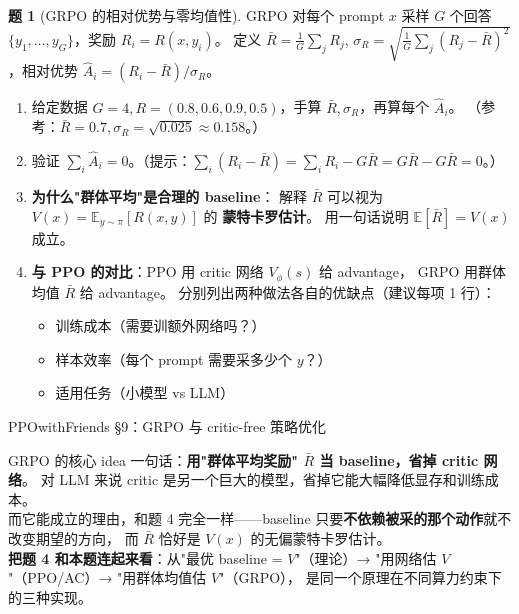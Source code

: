 \documentclass[11pt,a4paper]{article}
\theoremstyle{definition}
\newtheorem{problem}{题}
\begin{document}
\medskip

\begin{problem}[GRPO 的相对优势与零均值性]
GRPO 对每个 prompt $x$ 采样 $G$ 个回答 $\{y_1, \ldots, y_G\}$，奖励 $R_i = R(x, y_i)$。
定义 $\bar R = \frac{1}{G}\sum_j R_j$, $\sigma_R = \sqrt{\frac{1}{G}\sum_j (R_j - \bar R)^2}$，相对优势 $\hat A_i = (R_i - \bar R)/\sigma_R$。

\begin{enumerate}[label=(\alph*)]
    \item 给定数据 $G = 4, R = (0.8, 0.6, 0.9, 0.5)$，手算 $\bar R, \sigma_R$，再算每个 $\hat A_i$。
    （参考：$\bar R = 0.7, \sigma_R = \sqrt{0.025} \approx 0.158$。）
    \item 验证 $\sum_i \hat A_i = 0$。（提示：$\sum_i (R_i - \bar R) = \sum_i R_i - G \bar R = G\bar R - G\bar R = 0$。）
    \item \textbf{为什么"群体平均"是合理的 baseline}：
    解释 $\bar R$ 可以视为 $V(x) = \mathbb{E}_{y \sim \pi}[R(x, y)]$ 的 \textbf{蒙特卡罗估计}。
    用一句话说明 $\mathbb{E}[\bar R] = V(x)$ 成立。
    \item \textbf{与 PPO 的对比}：PPO 用 critic 网络 $V_\phi(s)$ 给 advantage，
    GRPO 用群体均值 $\bar R$ 给 advantage。
    分别列出两种做法各自的优缺点（建议每项 1 行）：
    \begin{itemize}
        \item 训练成本（需要训额外网络吗？）
        \item 样本效率（每个 prompt 需要采多少个 $y$？）
        \item 适用任务（小模型 vs LLM）
    \end{itemize}
\end{enumerate}
\begin{topicbox}
PPOwithFriends §9：GRPO 与 critic-free 策略优化
\end{topicbox}
\begin{takeaway}
GRPO 的核心 idea 一句话：\textbf{用"群体平均奖励" $\bar R$ 当 baseline，省掉 critic 网络}。
对 LLM 来说 critic 是另一个巨大的模型，省掉它能大幅降低显存和训练成本。\\
而它能成立的理由，和题 4 完全一样——baseline 只要\textbf{不依赖被采的那个动作}就不改变期望的方向，
而 $\bar R$ 恰好是 $V(x)$ 的无偏蒙特卡罗估计。\\
\textbf{把题 4 和本题连起来看}：从"最优 baseline = $V$"（理论）→ "用网络估 $V$"（PPO/AC）→ "用群体均值估 $V$"（GRPO），
是同一个原理在不同算力约束下的三种实现。
\end{takeaway}
\end{problem}
\end{document}
